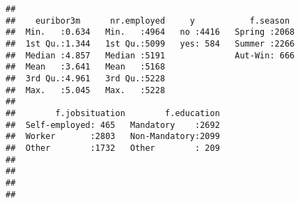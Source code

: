 \documentclass[]{article}
\begin{document}
\begin{verbatim}
##                                                                       
##    euribor3m      nr.employed     y           f.season   
##  Min.   :0.634   Min.   :4964   no :4416   Spring :2068  
##  1st Qu.:1.344   1st Qu.:5099   yes: 584   Summer :2266  
##  Median :4.857   Median :5191              Aut-Win: 666  
##  Mean   :3.641   Mean   :5168                            
##  3rd Qu.:4.961   3rd Qu.:5228                            
##  Max.   :5.045   Max.   :5228                            
##                                                          
##        f.jobsituation        f.education  
##  Self-employed: 465   Mandatory    :2692  
##  Worker       :2803   Non-Mandatory:2099  
##  Other        :1732   Other        : 209  
##                                           
##                                           
##                                           
## 
\end{verbatim}
\end{document}
